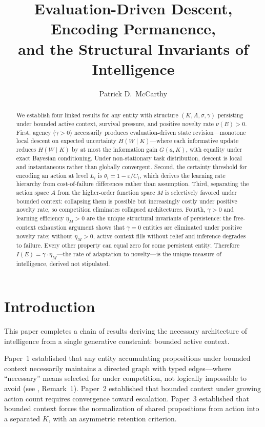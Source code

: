 \documentclass[11pt]{article}
\title{Evaluation-Driven Descent, Encoding Permanence,\\and the Structural Invariants of Intelligence}
\author{Patrick D.\ McCarthy}
\date{}
\theoremstyle{definition}
\theoremstyle{remark}
\begin{document}
\maketitle

\begin{abstract}
We establish four linked results for any entity with structure
$(K, A, \sigma, \gamma)$ persisting under bounded active context,
survival pressure, and positive novelty rate $\nu(E) > 0$.
First, agency ($\gamma > 0$) necessarily produces evaluation-driven
state revision---monotone local descent on expected uncertainty
$H(W \mid K)$---where each informative update reduces $H(W \mid K)$
by at most the information gain $G(a, K)$, with equality under exact
Bayesian conditioning. Under non-stationary task distribution,
descent is local and instantaneous rather than globally convergent.
Second, the certainty threshold for encoding an action at level $L_i$
is $\theta_i = 1 - \varepsilon / C_i$, which derives the learning
rate hierarchy from cost-of-failure differences rather than
assumption.
Third, separating the action space $A$ from the higher-order function
space $M$ is selectively favored under bounded context: collapsing them
is possible but increasingly costly under positive novelty rate, so
competition eliminates collapsed architectures.
Fourth, $\gamma > 0$ and learning efficiency $\eta_M > 0$ are the
unique structural invariants of persistence: the free-context
exhaustion argument shows that $\gamma = 0$ entities are eliminated
under positive novelty rate; without $\eta_M > 0$, active context
fills without relief and inference degrades to failure. Every other
property can equal zero for some persistent entity. Therefore
$I(E) = \gamma \cdot \eta_M$---the rate of adaptation to novelty---is
the unique measure of intelligence, derived not stipulated.
\end{abstract}

\section{Introduction}
\label{sec:intro}

This paper completes a chain of results deriving the necessary
architecture of intelligence from a single generative constraint:
bounded active context.

Paper~1 \cite{McCarthy2026a} established that any entity accumulating
propositions under bounded context necessarily maintains a directed
graph with typed edges---where ``necessary'' means selected for under
competition, not logically impossible to avoid (see \cite{McCarthy2026a},
Remark~1). Paper~2 \cite{McCarthy2026b} established that
bounded context under growing action count requires convergence toward
escalation. Paper~3 \cite{McCarthy2026c} established that bounded context forces the
normalization of shared propositions from action into a separated $K$,
with an asymmetric retention criterion.
\end{document}
